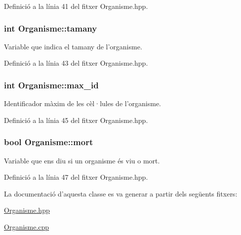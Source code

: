 Definició a la línia 41 del fitxer Organisme.\-hpp.

\hypertarget{class_organisme_a5d30992b5ded1a9314aff94ce9fb3932}{
\subsubsection[{tamany}]{\setlength{\rightskip}{0pt plus 5cm}int Organisme\-::tamany\hspace{0.3cm}{\ttfamily [private]}}}\label{class_organisme_a5d30992b5ded1a9314aff94ce9fb3932}


Variable que indica el tamany de l'organisme. 



Definició a la línia 43 del fitxer Organisme.\-hpp.

\hypertarget{class_organisme_ae7f51a74f01cee155cf88a5b01545f78}{
\subsubsection[{max\-\_\-id}]{\setlength{\rightskip}{0pt plus 5cm}int Organisme\-::max\-\_\-id\hspace{0.3cm}{\ttfamily [private]}}}\label{class_organisme_ae7f51a74f01cee155cf88a5b01545f78}


Identificador màxim de les cèl·lules de l'organisme. 



Definició a la línia 45 del fitxer Organisme.\-hpp.

\hypertarget{class_organisme_ae20564db8d9ba5b7547750375010ed7b}{
\subsubsection[{mort}]{\setlength{\rightskip}{0pt plus 5cm}bool Organisme\-::mort\hspace{0.3cm}{\ttfamily [private]}}}\label{class_organisme_ae20564db8d9ba5b7547750375010ed7b}


Variable que ens diu si un organisme és viu o mort. 



Definició a la línia 47 del fitxer Organisme.\-hpp.



La documentació d'aquesta classe es va generar a partir dels següents fitxers\-:\begin{DoxyCompactItemize}
\item 
\hyperlink{_organisme_8hpp}{Organisme.\-hpp}\item 
\hyperlink{_organisme_8cpp}{Organisme.\-cpp}\end{DoxyCompactItemize}
